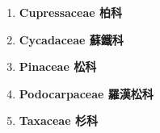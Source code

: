     \begin{enumerate}
      \item[] \begin{small}\textbf{Cupressaceae 柏科} \end{small}
        
      \item[] \begin{small}\textbf{Cycadaceae 蘇鐵科} \end{small}
        
      \item[] \begin{small}\textbf{Pinaceae 松科} \end{small}
        
      \item[] \begin{small}\textbf{Podocarpaceae 羅漢松科} \end{small}
        
      \item[] \begin{small}\textbf{Taxaceae 杉科} \end{small}
        
    \end{enumerate}
